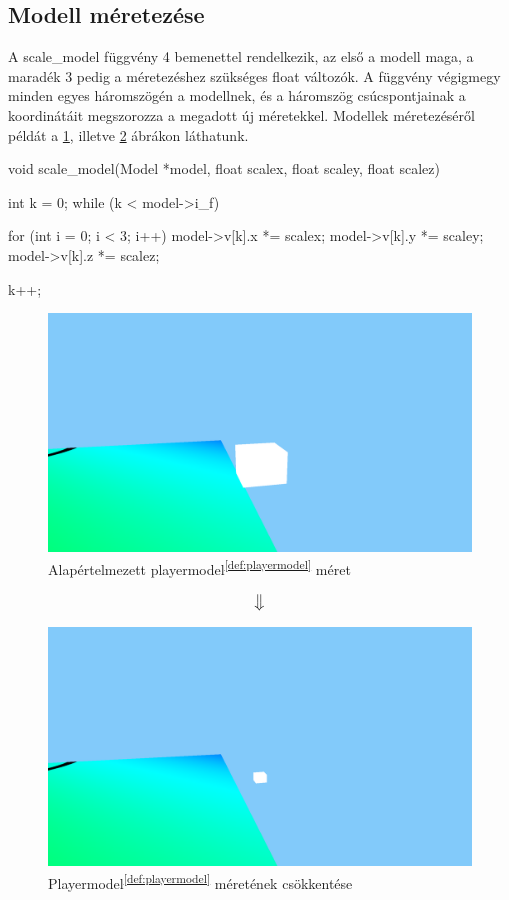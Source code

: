 \subsection{Modell méretezése}
A scale\_model függvény 4 bemenettel rendelkezik, az első a modell maga, a maradék 3 pedig a méretezéshez szükséges float változók. A függvény végigmegy minden egyes háromszögén a modellnek, és a háromszög csúcspontjainak a koordinátáit megszorozza a megadott új méretekkel. Modellek méretezéséről példát a \ref{fig:meret_1}, illetve \ref{fig:meret_2} ábrákon láthatunk.
\begin{cpp}
void scale_model(Model *model, float scalex, float scaley, 
float scalez)
{
    int k = 0;
    while (k < model->i_f)
    {
        for (int i = 0; i < 3; i++)
        {
            model->v[k].x *= scalex;
            model->v[k].y *= scaley;
            model->v[k].z *= scalez;
        }
			
        k++;
    }
}
\end{cpp}


\newpage

\begin{figure}[h]
	\centering
	\includegraphics[width=13truecm, height=7truecm]{images/modell_4.3.1.1.png}
	\caption{Alapértelmezett playermodel\textsuperscript{\ref{def:playermodel}} méret}
	\label{fig:meret_1}
\end{figure}

	$$\big\Downarrow$$
	
	
\begin{figure}[h]
		\centering
		\includegraphics[width=13truecm, height=7truecm]{images/modell_4.3.1.3.png}
		\caption{Playermodel\textsuperscript{\ref{def:playermodel}} méretének csökkentése}
		\label{fig:meret_2}
\end{figure}


